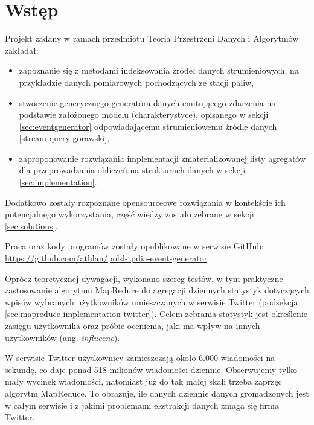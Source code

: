 \section{Wstęp}
\label{sec:intro}

Projekt zadany w ramach przedmiotu Teoria Przestrzeni Danych i Algorytmów zakładał:

\begin{itemize}[noitemsep]
  \item zapoznanie się z metodami indeksowania źródeł danych strumieniowych, na przykładzie danych pomiarowych pochodzących ze stacji paliw,
  \item stworzenie generycznego generatora danych emitującego zdarzenia na podstawie założonego modelu (charakterystyce), opisanego w sekcji \ref{sec:eventgenerator} odpowiadającemu strumieniowemu źródle danych \ref{stream-query-gorawski},
  \item zaproponowanie rozwiązania implementacji zmaterializowanej listy agregatów\cite{mal-lru-gorawski} dla przeprowadzania obliczeń na strukturach danych w sekcji \ref{sec:implementation}.
\end{itemize}

Dodatkowo zostały rozpoznane opensourceowe rozwiązania w kontekście ich potencjalnego wykorzystania, część wiedzy zostało zebrane w sekcji \ref{sec:solutions}.

Praca oraz kody programów zostały opublikowane w serwisie GitHub:\\
\url{https://github.com/athlan/polsl-tpdia-event-generator}

Oprócz teoretycznej dywagacji, wykonano szereg testów, w tym praktyczne zastosowanie algorytmu MapReduce do agregacji dziennych statystyk dotyczących wpisów wybranych użytkowników umieszczanych w serwisie Twitter (podsekcja \ref{sec:mapreduce-implementation-twitter}). Celem zebrania statystyk jest określenie zasięgu użytkownika oraz próbie ocenienia, jaki ma wpływ na innych użytkowników (ang. \emph{influcene}).

W serwisie Twitter użytkownicy zamieszczają około 6.000 wiadomości na sekundę, co daje ponad 518 milionów wiadomości dziennie. Obserwujemy tylko mały wycinek wiadomości, natomiast już do tak małej skali trzeba zaprzęc algorytm MapReduce. To obrazuje, ile danych dziennie danych gromadzonych jest w całym serwisie i z jakimi problemami ekstrakcji danych zmaga się firma Twitter.
